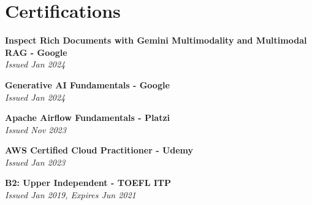 \documentclass[letterpaper,11pt]{article}
\begin{document}
 
\section{Certifications}
  \begin{itemize}[leftmargin=0.15in, label={}]
    \small{\item{
     \textbf{Inspect Rich Documents with Gemini Multimodality and Multimodal RAG - Google} \\
     \textit{Issued Jan 2024} \\
    }}
    \small{\item{
     \textbf{Generative AI Fundamentals - Google} \\
     \textit{Issued Jan 2024} \\
    }}
    \small{\item{
     \textbf{Apache Airflow Fundamentals - Platzi} \\
     \textit{Issued Nov 2023} \\
    }}
    \small{\item{
     \textbf{AWS Certified Cloud Practitioner - Udemy} \\
     \textit{Issued Jan 2023} \\
    }}
    \small{\item{
     \textbf{B2: Upper Independent - TOEFL ITP} \\
     \textit{Issued Jan 2019, Expires Jun 2021} \\
    }}
 \end{itemize}


\end{document}
